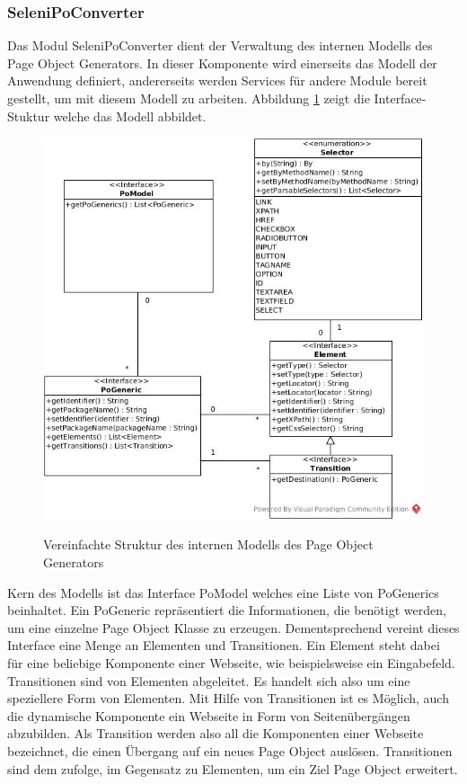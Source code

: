 \subsubsection{SeleniPoConverter}
\label{sec:selenipoconverter}
Das Modul SeleniPoConverter dient der Verwaltung des internen Modells des Page Object Generators. In dieser Komponente wird einerseits das Modell der Anwendung definiert, andererseits werden Services für andere Module bereit gestellt, um mit diesem Modell zu arbeiten.
Abbildung \ref{fig:simple_model} zeigt die Interface-Stuktur welche das Modell abbildet.

\begin{figure}[htb]
  \centering  
  \includegraphics[scale=0.46]{img/SimpleModel.jpg}\\
  \caption{Vereinfachte Struktur des internen Modells des Page Object Generators}
  \label{fig:simple_model}
\end{figure}

Kern des Modells ist das Interface PoModel welches eine Liste von PoGenerics beinhaltet. Ein PoGeneric repräsentiert die Informationen, die benötigt werden, um eine einzelne Page Object Klasse zu erzeugen. Dementsprechend vereint dieses Interface eine Menge an Elementen und Transitionen.
Ein Element steht dabei für eine beliebige Komponente einer Webseite, wie beispielsweise ein Eingabefeld.
Transitionen sind von Elementen abgeleitet. Es handelt sich also um eine speziellere Form von Elementen. Mit Hilfe von Transitionen ist es Möglich, auch die dynamische Komponente ein Webseite in Form von Seitenübergängen abzubilden. Als Transition werden also all die Komponenten einer Webseite bezeichnet, die einen Übergang auf ein neues Page Object auslösen. Transitionen sind dem zufolge, im Gegensatz zu Elementen, um ein Ziel Page Object erweitert.

